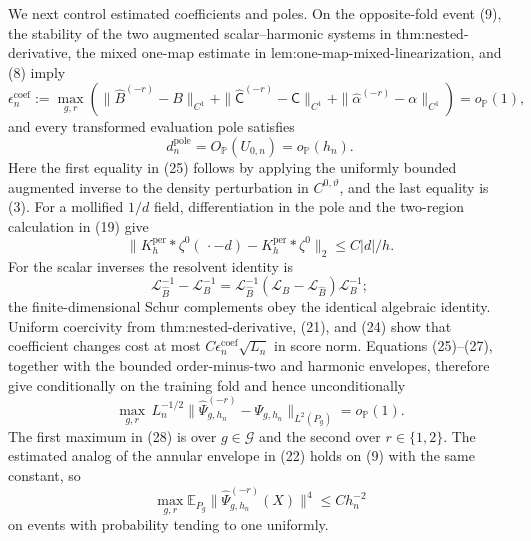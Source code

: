 We next control estimated coefficients and poles.  On the opposite-fold event (9), the stability of the two augmented scalar--harmonic systems in thm:nested-derivative, the mixed one-map estimate in lem:one-map-mixed-linearization, and (8) imply
\[
 \epsilon_n^{\mathrm{coef}}
 :=\max_{g,r}\left(
 \|\widehat B^{(-r)}-B\|_{C^1}
 +\|\widehat{\mathsf C}^{(-r)}-\mathsf C\|_{C^1}
 +\|\widehat\alpha^{(-r)}-\alpha\|_{C^1}
 \right)=o_{\mathbb P}(1),
\tag{24}
\]
and every transformed evaluation pole satisfies
\[
 d_n^{\mathrm{pole}}=O_{\mathbb P}(U_{0,n})=o_{\mathbb P}(h_n).
\tag{25}
\]
Here the first equality in (25) follows by applying the uniformly bounded augmented inverse to the density perturbation in \(C^{0,\vartheta}\), and the last equality is (3).  For a mollified \(1/d\) field, differentiation in the pole and the two-region calculation in (19) give
\[
 \|K_h^{\mathrm{per}}*\zeta^0(\,\cdot-d)
       -K_h^{\mathrm{per}}*\zeta^0\|_2
 \leq C|d|/h.
\tag{26}
\]
For the scalar inverses the resolvent identity is
\[
 \mathcal L_{\widehat B}^{-1}-\mathcal L_B^{-1}
 =\mathcal L_{\widehat B}^{-1}
   (\mathcal L_B-\mathcal L_{\widehat B})\mathcal L_B^{-1};
\tag{27}
\]
the finite-dimensional Schur complements obey the identical algebraic identity.  Uniform coercivity from thm:nested-derivative, (21), and (24) show that coefficient changes cost at most
\(C\epsilon_n^{\mathrm{coef}}\sqrt{L_n}\) in score norm.  Equations (25)--(27), together with the bounded order-minus-two and harmonic envelopes, therefore give conditionally on the training fold and hence unconditionally
\[
 \max_{g,r}\,L_n^{-1/2}
 \|\widehat\Psi_{g,h_n}^{(-r)}-\Psi_{g,h_n}\|_{L^2(P_g)}
 =o_{\mathbb P}(1).
\tag{28}
\]
The first maximum in (28) is over \(g\in\mathcal G\) and the second over
\(r\in\{1,2\}\).  The estimated analog of the annular envelope in (22) holds on (9) with the same constant, so
\[
 \max_{g,r}\mathbb E_{P_g}
 \|\widehat\Psi_{g,h_n}^{(-r)}(X)\|^4\leq Ch_n^{-2}
\tag{29}
\]
on events with probability tending to one uniformly.

